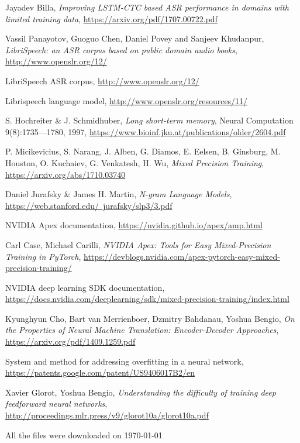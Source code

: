 \documentclass[licencjacka,en]{pracamgr}
\newcommand{\bibDownloadDate}{\today}
\begin{document}
\begin{thebibliography}{99}
		 Jayadev Billa, \textit{Improving LSTM-CTC based ASR performance in domains with limited training data}, 
		\href{https://arxiv.org/pdf/1707.00722.pdf}{https://arxiv.org/pdf/1707.00722.pdf}
		
		 Vassil Panayotov, Guoguo Chen, Daniel Povey and Sanjeev Khudanpur, \textit{LibriSpeech: an ASR corpus based on public domain audio books}, 
		\href{http://www.openslr.org/12/}{http://www.openslr.org/12/}
		
		 LibriSpeech ASR corpus,  \href{http://www.openslr.org/12/}{http://www.openslr.org/12/}
		
		 Librispeech language model,
		\href{http://www.openslr.org/resources/11/}{http://www.openslr.org/resources/11/}
		
		 S. Hochreiter \& J. Schmidhuber, \textit{Long short-term memory}, Neural Computation 9(8):1735—1780, 1997,  \href{https://www.bioinf.jku.at/publications/older/2604.pdf}{https://www.bioinf.jku.at/publications/older/2604.pdf}
		
		  P. Micikevicius, S. Narang, J. Alben, G. Diamos, E. Eelsen, B. Ginsburg, M. Houston, O. Kuchaiev, G. Venkatesh, H. Wu, \textit{Mixed Precision Training},
		\href{https://arxiv.org/abs/1710.03740}{https://arxiv.org/abs/1710.03740}
		
		 Daniel Jurafsky \& James H. Martin, \textit{N-gram Language Models}, 	\href{https://web.stanford.edu/~jurafsky/slp3/3.pdf}{https://web.stanford.edu/~jurafsky/slp3/3.pdf}
		
		NVIDIA Apex documentation,
		\href{https://nvidia.github.io/apex/amp.html}{https://nvidia.github.io/apex/amp.html}
		
		
		Carl Case, Michael Carilli, \textit{NVIDIA Apex: Tools for Easy Mixed-Precision Training in PyTorch}, 
		\href{https://devblogs.nvidia.com/apex-pytorch-easy-mixed-precision-training/}{https://devblogs.nvidia.com/apex-pytorch-easy-mixed-precision-training/}
		
		NVIDIA deep learning SDK documentation, 
		\href{https://docs.nvidia.com/deeplearning/sdk/mixed-precision-training/index.html}{https://docs.nvidia.com/deeplearning/sdk/mixed-precision-training/index.html}
		
		 Kyunghyun Cho, Bart van Merrienboer, Dzmitry Bahdanau, Yoshua Bengio, \textit{On the Properties of Neural Machine Translation: Encoder-Decoder Approaches},  \href{https://arxiv.org/pdf/1409.1259.pdf}{https://arxiv.org/pdf/1409.1259.pdf}
		
		 System and method for addressing overfitting in a neural network,  \href{https://patents.google.com/patent/US9406017B2/en}{https://patents.google.com/patent/US9406017B2/en}
		
		 Xavier Glorot, Yoshua Bengio, \textit{Understanding the difficulty of training deep feedforward neural networks},  \href{http://proceedings.mlr.press/v9/glorot10a/glorot10a.pdf}{http://proceedings.mlr.press/v9/glorot10a/glorot10a.pdf}
		
	\end{thebibliography}
	All the files were downloaded on \bibDownloadDate
	
\end{document}
